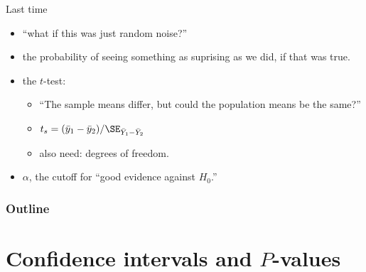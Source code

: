 
%
%
%



\subtitle{hypothesis testing, and one-sided tests}

\date{5 March 2015}





\begin{frame}
  \maketitle
\end{frame}

\begin{frame}{Last time}

  \begin{itemize}
    \item {} ``what if this was just random noise?''
    \item {} the probability of seeing something as suprising as we did, if that was true.
    \item the $t$-test: 
      \begin{itemize}
        \item ``The sample means differ, but could the population means be the same?''
        \item $t_s = (\bar y_1 - \bar y_2) / \SE_{\bar Y_1 - \bar Y_2}$
        \item also need: degrees of freedom.
      \end{itemize}
    \item {} $\alpha$, the cutoff for ``good evidence against $H_0$.''
  \end{itemize}

\end{frame}


\begin{frame}\frametitle<presentation>{Outline}
  \tableofcontents
\end{frame}


\section{Confidence intervals and $P$-values}


